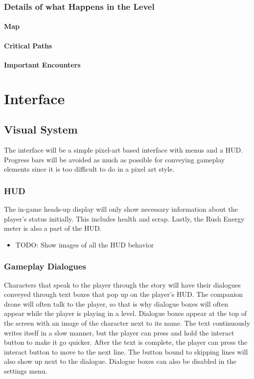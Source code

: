 \documentclass[12pt]{article}
\begin{document}
\subsubsection{Details of what Happens in the Level}

\paragraph{Map}

\paragraph{Critical Paths}

\paragraph{Important Encounters}

\section{Interface}

\subsection{Visual System}

The interface will be a simple pixel-art based interface with menus and a HUD. Progress bars will be avoided as much as possible for conveying gameplay elements since it is too difficult to do in a pixel art style. 

\subsubsection{HUD}

The in-game heads-up display will only show necessary information about the player's status initially. This includes health and scrap. Lastly, the Rush Energy meter is also a part of the HUD.

\begin{itemize}
	\item TODO: Show images of all the HUD behavior
\end{itemize}

\subsubsection{Gameplay Dialogues}

Characters that speak to the player through the story will have their dialogues conveyed through text boxes that pop up on the player's HUD. The companion drone will often talk to the player, so that is why dialogue boxes will often appear while the player is playing in a level. Dialogue boxes appear at the top of the screen with an image of the character next to its name. The text continuously writes itself in a slow manner, but the player can press and hold the interact button to make it go quicker. After the text is complete, the player can press the interact button to move to the next line. The button bound to skipping lines will also show up next to the dialogue. Dialogue boxes can also be disabled in the settings menu. 
\end{document}
